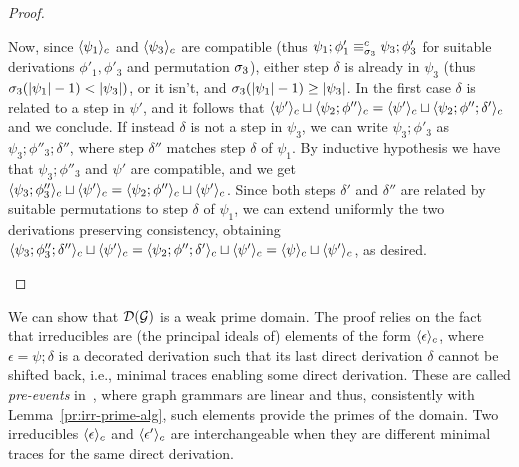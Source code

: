 \begin{proof}
\begin{enumerate}
    Now, since $\langle {\psi_1}\rangle_c$ and  $\langle {\psi_3}\rangle_c$ are compatible (thus
    $\psi_1;\phi'_1 \equiv^c_{\sigma_3} \psi_3;\phi'_3$ for suitable derivations 
    $\phi'_1, \phi'_3$ and permutation $\sigma_3$), either step $\delta$ is 
    already in $\psi_3$ (thus $\sigma_3(|\psi_1|-1) < |\psi_3|)$, or it isn't, and 
    $\sigma_3(|\psi_1|-1) \geq |\psi_3|$. In the first case $\delta$ is related to 
    a step in $\psi'$, and it follows that $\langle {\psi'}\rangle_c \sqcup  \langle {\psi_2; \phi''}\rangle_c = 
    \langle {\psi'}\rangle_c \sqcup  \langle {\psi_2; \phi'';\delta'}\rangle_c$ and we conclude. 
    If instead $\delta$ is not a step in $\psi_3$,  we can write $\psi_3;\phi'_3$ as
     $\psi_3;\phi''_3;\delta''$, where step $\delta''$ matches step $\delta$ of $\psi_1$.
     By inductive hypothesis we have that $\psi_3;\phi''_3$ and $\psi'$ are compatible, 
     and we get $\langle {\psi_3;\phi''_3}\rangle_c \sqcup \langle {\psi'}\rangle_c = 
     \langle {\psi_2;\phi''}\rangle_c \sqcup \langle {\psi'}\rangle_c$. Since both steps $\delta'$ and $\delta''$ are 
     related by suitable
     permutations to step $\delta$ of $\psi_1$, we 
     can extend uniformly the two derivations preserving consistency,  obtaining
      $\langle {\psi_3;\phi''_3;\delta''}\rangle_c \sqcup \langle {\psi'}\rangle_c = 
     \langle {\psi_2;\phi'';\delta'}\rangle_c \sqcup \langle {\psi'}\rangle_c =  \langle {\psi}\rangle_c \sqcup \langle {\psi'}\rangle_c$, as desired.
        
%    
      \end{enumerate}
\end{proof}


We can show that $\mathcal{D}({\mathcal{G}})$ is a weak prime domain. The proof relies on the fact that irreducibles
are (the principal ideals of) elements of the form $\langle {\epsilon}\rangle_c$, where
$\epsilon = \psi; \delta$ is a decorated derivation such that its last
direct derivation $\delta$ cannot be shifted back, i.e., minimal
traces enabling some direct derivation. These are called
\emph{pre-events} in~\cite{Handbook,Bal:PhD}, where graph
grammars are linear and thus, consistently with Lemma~\ref{pr:irr-prime-alg}, such
elements provide the primes of the domain. Two irreducibles
$\langle {\epsilon}\rangle_c$ and $\langle {\epsilon'}\rangle_c$ are interchangeable when
they are different minimal traces for the same direct derivation. 

